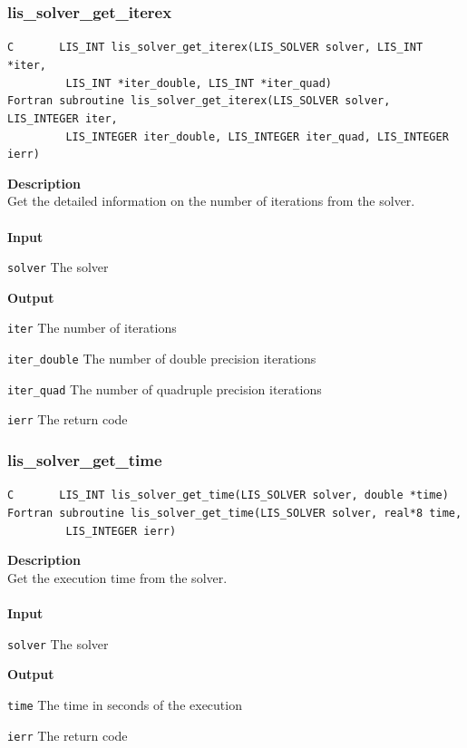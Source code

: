 \documentclass[a4paper]{article}
\newcommand{\namelistlabel}[1]{\mbox{#1}\hfill}
\newenvironment{namelist}[1]{%
\begin{list}{}
  {\let\makelabel\namelistlabel
  \settowidth{\labelwidth}{#1}
  \setlength{\leftmargin}{1.1\labelwidth}}
  }{%
\end{list}}
\begin{document}
\newpage
\subsubsection{lis\_solver\_get\_iterex}
\begin{screen}
\verb|C       LIS_INT lis_solver_get_iterex(LIS_SOLVER solver, LIS_INT *iter,|\\
\verb|         LIS_INT *iter_double, LIS_INT *iter_quad)|\\
\verb|Fortran subroutine lis_solver_get_iterex(LIS_SOLVER solver, LIS_INTEGER iter,|\\
\verb|         LIS_INTEGER iter_double, LIS_INTEGER iter_quad, LIS_INTEGER ierr)|
\end{screen}
{\bf Description}\\
\indent
Get the detailed information on the number of iterations from the solver.
\\ \\
\noindent
{\bf Input}
\begin{namelist}{XXXXXXXXXXXXXXXXXXXX}
\item[\tt solver] The solver
\end{namelist}
{\bf Output}
\begin{namelist}{XXXXXXXXXXXXXXXXXXXX}
\item[\tt iter] The number of iterations
\item[\tt iter\_double] The number of double precision iterations
\item[\tt iter\_quad] The number of quadruple precision iterations
\item[\tt ierr] The return code
\end{namelist}

\subsubsection{lis\_solver\_get\_time}
\begin{screen}
\verb|C       LIS_INT lis_solver_get_time(LIS_SOLVER solver, double *time)|\\
\verb|Fortran subroutine lis_solver_get_time(LIS_SOLVER solver, real*8 time,|\\
\verb|         LIS_INTEGER ierr)|
\end{screen}
{\bf Description}\\
\indent
Get the execution time from the solver.
\\ \\
\noindent
{\bf Input}
\begin{namelist}{XXXXXXXXXXXXXXXXXXXX}
\item[\tt solver] The solver
\end{namelist}
{\bf Output}
\begin{namelist}{XXXXXXXXXXXXXXXXXXXX}
\item[\tt time] The time in seconds of the execution
\item[\tt ierr] The return code
\end{namelist}
\end{document}
